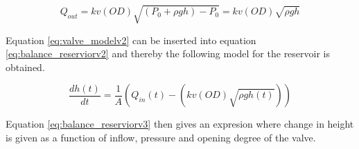 \begin{equation}\label{eq:valve_modelv2}
	Q_{out} = kv(OD) \sqrt{(P_0 +\rho g h)- P_0} = kv(OD) \sqrt{\rho g h} 
\end{equation}

Equation \ref{eq:valve_modelv2} can be inserted into equation \ref{eq:balance_reserviorv2} and thereby the following model for the reservoir is obtained.

\begin{equation}\label{eq:balance_reserviorv3}
	\frac{dh(t)}{dt}=\frac{1}{A} \left(Q_{in}(t)-\left(kv(OD) \sqrt{\rho g h(t)}\right)\right)
\end{equation}

Equation \ref{eq:balance_reserviorv3} then gives an expresion where change in height is given as a function of inflow, pressure and opening degree of the valve. 